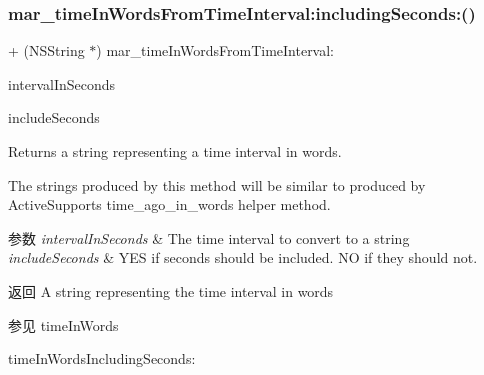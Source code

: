 \mbox{\label{category_n_s_date_07_m_a_r_e_x__brief_time_08_a88fc6aa79deb4cb45bd563759c109c80}} 
\subsubsection{\texorpdfstring{mar\+\_\+time\+In\+Words\+From\+Time\+Interval\+:including\+Seconds\+:()}{mar\_timeInWordsFromTimeInterval:includingSeconds:()}}
{\footnotesize\ttfamily + (N\+S\+String $\ast$) mar\+\_\+time\+In\+Words\+From\+Time\+Interval\+: \begin{DoxyParamCaption}\item[{(N\+S\+Time\+Interval)}]{interval\+In\+Seconds }\item[{includingSeconds:(B\+O\+OL)}]{include\+Seconds }\end{DoxyParamCaption}}

Returns a string representing a time interval in words.

The strings produced by this method will be similar to produced by Active\+Support\textquotesingle{}s {\ttfamily time\+\_\+ago\+\_\+in\+\_\+words} helper method.


\begin{DoxyParams}{参数}
{\em interval\+In\+Seconds} & The time interval to convert to a string\\
\hline
{\em include\+Seconds} & {\ttfamily Y\+ES} if seconds should be included. {\ttfamily NO} if they should not.\\
\hline
\end{DoxyParams}
\begin{DoxyReturn}{返回}
A string representing the time interval in words
\end{DoxyReturn}
\begin{DoxySeeAlso}{参见}
time\+In\+Words 

time\+In\+Words\+Including\+Seconds\+: 
\end{DoxySeeAlso}
\mbox{\label{category_n_s_date_07_m_a_r_e_x__brief_time_08_ab0e5ee3344f27424852f5aaa360e099c}} 
